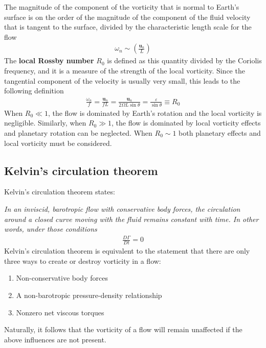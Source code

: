\documentclass[a4paper, 12pt]{article}
\numberwithin{equation}{subsubsection}
\begin{document}
The magnitude of the component of the vorticity that is normal to Earth's surface is on the order of the magnitude of the component of the fluid velocity that is tangent to the surface, divided by the characteristic length scale for the flow
\begin{align}
	\omega_n \sim \left(\frac{\mathbf{u}_n}{L}\right)
\end{align}
The \textbf{local Rossby number} $R_0$ is defined as this quantity divided by the Coriolis frequency, and it is a measure of the strength of the local vorticity. Since the tangential component of the velocity is usually very small, this leads to the following definition
\begin{align}
	\frac{\omega_n}{f} = \frac{\mathbf{u}_n}{fL} = \frac{\mathbf{u}_n}{2 \Omega L \sin \theta} = \frac{\varepsilon}{\sin \theta} \equiv R_0
\end{align} 
When $R_0 \ll 1$, the flow is dominated by Earth's rotation and the local vorticity is negligible. Similarly, when $R_0 \gg 1$, the flow is dominated by local vorticity effects and planetary rotation can be neglected. When $R_0 \sim 1$ both planetary effects and local vorticity must be considered.

\subsection{Kelvin's circulation theorem}
Kelvin's circulation theorem states:

\textit{In an inviscid, barotropic flow with conservative body forces, the circulation around a closed curve moving with the fluid remains constant with time. In other words, under those conditions}
\begin{align}
	\frac{D\Gamma}{Dt} = 0
\end{align}
Kelvin's circulation theorem is equivalent to the statement that there are only three ways to create or destroy vorticity in a flow:
\begin{enumerate}
	\item Non-conservative body forces
	\item A non-barotropic pressure-density relationship
	\item Nonzero net viscous torques
\end{enumerate}
Naturally, it follows that the vorticity of a flow will remain unaffected if the above influences are not present.
\end{document}
